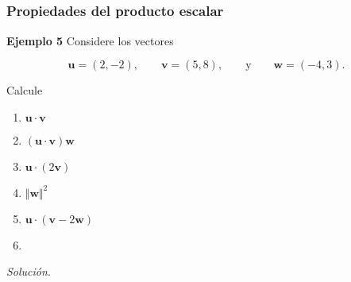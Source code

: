 
\subsection{}

\begin{frame}\frametitle{Propiedades del producto escalar}

\begin{ej}{\textbf{Ejemplo 5}}
	Considere los vectores
	
	\vspace{-2mm}
	\[
		\mathbf{u}=(2,-2), \qquad \mathbf{v}=(5,8), \qquad \text{y} \qquad \mathbf{w}=(-4,3).
	\]
	
	\vspace{-1mm}
	Calcule
	
	\vspace{-2mm}
	\begin{multicols}{3}
		\begin{enumerate}
			\item[\labelname{$a$}] $\mathbf{u}\cdot \mathbf{v}$
			\item[\labelname{$b$}] $(\mathbf{u}\cdot \mathbf{v}) \mathbf{w}$
			\item[\labelname{$c$}] $\mathbf{u}\cdot (2\mathbf{v})$
			\item[\labelname{$d$}] $\Vert \mathbf{w} \Vert^2$
			\item[\labelname{$e$}] $\mathbf{u}\cdot (\mathbf{v}-2\mathbf{w})$
			\item[]
		\end{enumerate}
	\end{multicols}
\end{ej}
\textit{Solución}.

\end{frame}


\subsection{}

